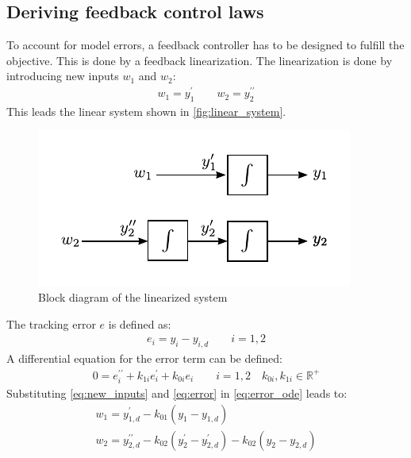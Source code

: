 \documentclass[a4paper,11pt,headings=standardclasses,parskip=half]{scrartcl}
\newcommand{\R}{\mathbb{R}} %
\begin{document}
\subsection{Deriving feedback control laws}
To account for model errors, a feedback controller has to be designed to fulfill the objective. This is done by a feedback linearization.
The linearization is done by introducing new inputs $w_1$ and $w_2$:
\begin{align}
\label{eq:new_inputs}
w_1 = y_1^\prime \qquad w_2 = y_2^{\prime\prime}
\end{align}
This leads the linear system shown in \autoref{fig:linear_system}. 
\begin{figure}[ht]
\centering
\includegraphics[scale=1]{img/linear_system.pdf}
\caption{Block diagram of the linearized system}
\label{fig:linear_system}
\end{figure}
The tracking error $e$ is defined as:
\begin{align}
\label{eq:error}
e_i = y_i-y_{i,d} \qquad i = 1,2
\end{align}
A differential equation for the error term can be defined:
\begin{align}
\label{eq:error_ode}
0 = e_i^{\prime\prime}+k_{1i}e_i^{\prime}+k_{0i}e_i \qquad i = 1,2 \quad k_{0i},k_{1i} \in \R^+
\end{align}
Substituting \eqref{eq:new_inputs} and \eqref{eq:error} in \eqref{eq:error_ode} leads to:
\begin{subequations}
\begin{align}
w_1 =  y_{1,d}^\prime - k_{01}(y_{1}-y_{1,d}) \\
w_2 = y_{2,d}^{\prime\prime}  - k_{02}(y_{2}^\prime-y_{2,d}^\prime) - k_{02}(y_{2}-y_{2,d})
\end{align}
\end{subequations}
\end{document}
